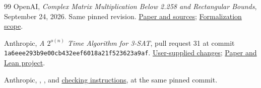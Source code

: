 \begin{thebibliography}{99}
 OpenAI, \emph{Complex Matrix Multiplication Below
2.258 and Rectangular Bounds}, September 24, 2026. Same pinned revision.
\href{https://github.com/openai/math/tree/7ef5c0cc5ca4b0e072b7a050fca09ab24bc6fa3a/preprints/Complex-Matrix-Multiplication-Below-2.258-and-Rectangular-Bounds-September-24-2026}{Paper and sources};
\href{https://github.com/openai/math/blob/7ef5c0cc5ca4b0e072b7a050fca09ab24bc6fa3a/lean/docs/107.md}{Formalization scope}.

 Anthropic, \emph{A $2^{o(n)}$ Time Algorithm for 3-SAT},
pull request 31 at commit
\texttt{1a6eee293b9e00cb432eef6018a21f523623a9af}.
\href{https://github.com/anthropics/formal-math/pull/31/changes/1a6eee293b9e00cb432eef6018a21f523623a9af}{User-supplied changes};
\href{https://github.com/anthropics/formal-math/tree/1a6eee293b9e00cb432eef6018a21f523623a9af/eth}{Paper and Lean project}.

 Anthropic,
\href{https://github.com/anthropics/formal-math/blob/1a6eee293b9e00cb432eef6018a21f523623a9af/eth/MainResults.lean}{},
\href{https://github.com/anthropics/formal-math/blob/1a6eee293b9e00cb432eef6018a21f523623a9af/eth/Solution.lean}{}, and
\href{https://github.com/anthropics/formal-math/blob/1a6eee293b9e00cb432eef6018a21f523623a9af/eth/README.md}{checking instructions}, at the same pinned commit.
\end{thebibliography}
